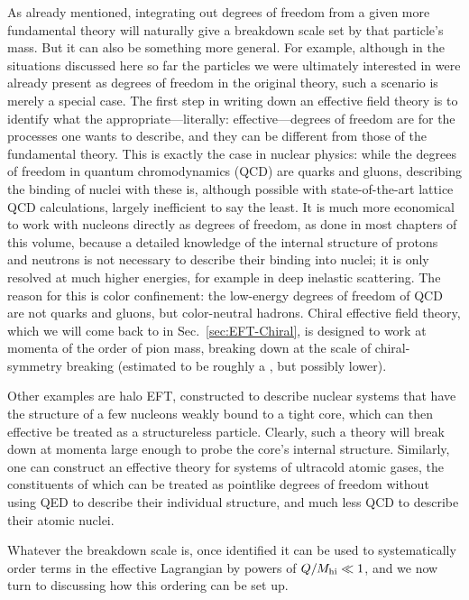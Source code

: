 As already mentioned, integrating out degrees of freedom from a given more 
fundamental theory will naturally give a breakdown scale set by that particle's 
mass.  But it can also be something more general.  For example, although in the 
situations discussed here so far the particles we were ultimately interested in 
were already present as degrees of freedom in the original theory, such a 
scenario is merely a special case.  The first step in writing down an effective 
field theory is to identify what the appropriate---literally: 
effective---degrees of freedom are for the processes one wants to describe, and 
they can be different from those of the fundamental theory.  This is exactly 
the case in nuclear physics: while the degrees of freedom in quantum 
chromodynamics (QCD) are quarks and gluons, describing the binding of nuclei 
with these is, although possible with state-of-the-art lattice QCD 
calculations, largely inefficient to say the least.  It is much more economical 
to work with nucleons directly as degrees of freedom, as done in most chapters 
of this volume, because a detailed knowledge of the internal structure of 
protons and neutrons is not necessary to describe their binding into nuclei; it 
is only resolved at much higher energies, for example in deep inelastic 
scattering.  The reason for this is color confinement: the low-energy degrees 
of freedom of QCD are not quarks and gluons, but color-neutral hadrons.  Chiral 
effective field theory, which we will come back to in 
Sec.~\ref{sec:EFT-Chiral}, is designed to work at momenta of the order of pion 
mass, breaking down at the scale of chiral-symmetry breaking (estimated to be 
roughly a \GeV, but possibly lower).

Other examples are halo EFT, constructed to describe nuclear systems that have 
the structure of a few nucleons weakly bound to a tight core, which can then 
effective be treated as a structureless particle.  Clearly, such a theory will 
break down at momenta large enough to probe the core's internal structure.  
Similarly, one can construct an effective theory for systems of ultracold 
atomic gases, the constituents of which can be treated as pointlike degrees of 
freedom without using QED to describe their individual structure, and much less 
QCD to describe their atomic nuclei.

Whatever the breakdown scale is, once identified it can be used to 
systematically order terms in the effective Lagrangian by powers of 
$Q/M_{\rm hi} \ll 1$, and we now turn to discussing how this ordering can be set 
up.

